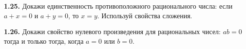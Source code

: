 \noindent\begin{minipage}[t]{\linewidth}\textbf{1.25.} Докажи единственность противоположного рационального числа: если \(a+x=0\) и \(a+y=0\), то \(x=y\). Используй свойства сложения.\par\end{minipage}\par
\noindent\begin{minipage}[t]{\linewidth}\textbf{1.26.} Докажи свойство нулевого произведения для рациональных чисел: \(ab=0\) тогда и только тогда, когда \(a=0\) или \(b=0\).\par\end{minipage}\par
\endgroup
